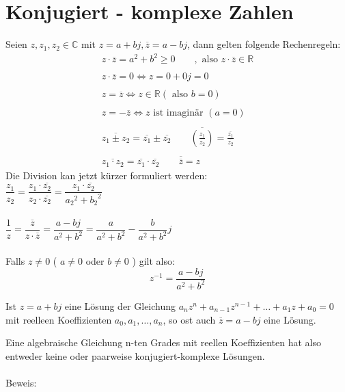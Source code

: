 \section{Konjugiert - komplexe Zahlen}
Seien $z, z_1, z_2 \in \mathbb{C}$ mit $z = a + b j, \overline{z} = a - b j$, dann gelten folgende Rechenregeln: 
\[ \boxed{\begin{array}{l}
  z \cdot \overline{z} = a^2 + b^2 \geq 0 \qquad , \text{ also } z \cdot \overline{z} \in \mathbb{R}\\\\
  z \cdot \overline{z} = 0 \Leftrightarrow z = 0 + 0 j = 0\\\\
  z = \overline{z} \Leftrightarrow z \in \mathbb{R} (\text{ also } b = 0)\\\\
  z = -\overline{z} \Leftrightarrow z \text{ ist imaginär } (a = 0)\\\\
  \overline{z_1 \pm z_2} = \overline{z_1} \pm \overline{z_2} \qquad \overline{\left( \frac{z_1}{z_2} \right)} = \frac{\overline{z_1}}{\overline{z_2}}\\\\
  \overline{z_1 \cdot z_2} = \overline{z_1} \cdot \overline{z_2} \qquad \overline{\overline{z}} = z
\end{array}} \]
Die Division kan jetzt kürzer formuliert werden: \\
$\dfrac{z_1}{z_2} = \dfrac{z_1 \cdot \overline{z_2}}{z_2 \cdot \overline{z_2}} = \dfrac{z_1 \cdot \overline{z_2}}{{a_2}^2 + {b_2}^2}$\\\\
$\dfrac{1}{z} = \dfrac{\overline{z}}{z \cdot \overline{z}} = \dfrac{a - b j}{a^2 + b^2} = \dfrac{a}{a^2 + b^2} - \dfrac{b}{a^2 + b^2} j$\\\\
Falls $z\neq 0$ ( $a \neq 0$ oder $b \neq 0$ ) gilt also: 
\[ \boxed{z^{-1} = \frac{a - b j}{a^2 + b^2}} \]
\begin{framed}\noindent
  Ist $z = a + b j$ eine Lösung der Gleichung $a_n z^n + a_{n-1} z^{n - 1} + \dots + a_1 z + a_0 = 0$ mit reelleen Koeffizienten $a_0, a_1, \dots, a_n$, so ost auch $\overline{z} = a - b j$ eine Lösung. 
\end{framed}\noindent
Eine algebraische Gleichung n-ten Grades mit reellen Koeffizienten hat also entweder keine oder paarweise konjugiert-komplexe Lösungen. \\\\
Beweis: \\
